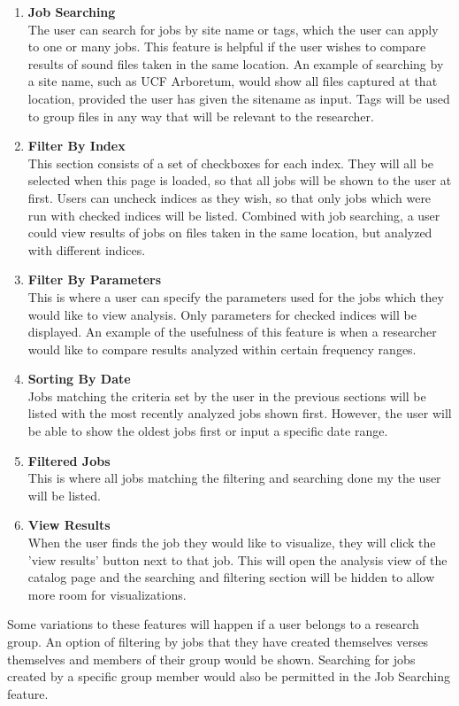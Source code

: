\begin{enumerate}
    \item \textbf{Job Searching}\\ The user can search for jobs by site name or tags, which the user can apply to one or many jobs. This feature is helpful if the user wishes to compare results of sound files taken in the same location. An example of searching by a site name, such as \textquotesingle UCF Arboretum\textquotesingle , would show all files captured at that location, provided the user has given the sitename as input. Tags will be used to group files in any way that will be relevant to the researcher.
    \item \textbf{Filter By Index}\\ This section consists of a set of checkboxes for each index. They will all be selected when this page is loaded, so that all jobs will be shown to the user at first. Users can uncheck indices as they wish, so that only jobs which were run with checked indices will be listed. Combined with job searching, a user could view results of jobs on files taken in the same location, but analyzed with different indices.
    \item \textbf{Filter By Parameters}\\ This is where a user can specify the parameters used for the jobs which they would like to view analysis. Only parameters for checked indices will be displayed. An example of the usefulness of this feature is when a researcher would like to compare results analyzed within certain frequency ranges.
    \item \textbf{Sorting By Date}\\ Jobs matching the criteria set by the user in the previous sections will be listed with the most recently analyzed jobs shown first. However, the user will be able to show the oldest jobs first or input a specific date range.
    \item \textbf{Filtered Jobs}\\ This is where all jobs matching the filtering and searching done my the user will be listed.
    \item \textbf{View Results}\\ When the user finds the job they would like to visualize, they will click the 'view results' button next to that job. This will open the analysis view of the catalog page and the searching and filtering section will be hidden to allow more room for visualizations.
\end{enumerate}
Some variations to these features will happen if a user belongs to a research group. An option of filtering by jobs that they have created themselves verses themselves and members of their group would be shown. Searching for jobs created by a specific group member would also be permitted in the Job Searching feature.\par

